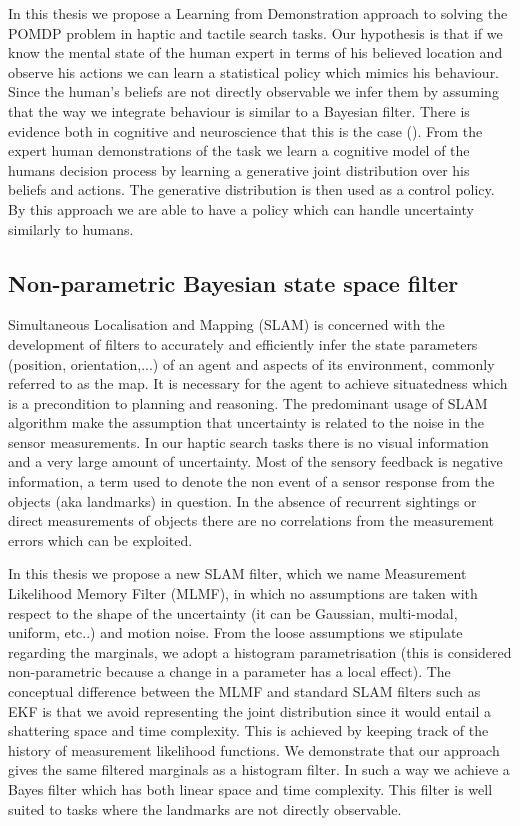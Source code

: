 In this thesis we propose a Learning from Demonstration approach to solving the POMDP problem in
haptic and tactile search tasks. Our hypothesis is that if we know the mental state of the human 
expert in terms of his believed location and observe his actions we can learn a statistical policy 
which mimics his behaviour. Since the human's beliefs are not directly observable we infer them 
by assuming that the way we integrate behaviour is similar to a Bayesian filter. There is   
evidence both in cognitive and neuroscience that this is the case (\cite{Bake_Saxe_Tene_2011}). From 
the expert human demonstrations of the task we learn a cognitive model of the humans decision process 
by learning a generative joint distribution over his beliefs and actions. The generative distribution 
is then used as a control policy. By this approach we are able to have a policy which can handle uncertainty
similarly to humans. 

\subsection{Non-parametric Bayesian state space filter}

Simultaneous Localisation and Mapping (SLAM) is concerned with the development of filters to accurately and efficiently infer 
the state parameters (position, orientation,...) of an agent and aspects of its environment, commonly referred to as the map. 
It is necessary for the agent to achieve situatedness which is a precondition to planning and reasoning. The 
predominant usage of SLAM algorithm make the assumption that uncertainty is related to the noise in the sensor measurements. In 
our haptic search tasks there is no visual information and a very large amount of uncertainty. Most of the sensory
feedback is negative information, a term used to denote the non event of a sensor response from the objects (aka landmarks) in question.
In the absence of recurrent sightings or direct measurements of objects there are no correlations from the measurement errors 
which can be exploited. 

In this thesis we propose a new SLAM filter, which we name Measurement Likelihood Memory Filter (MLMF), in 
which no assumptions are taken with respect to the shape of the uncertainty (it can be Gaussian, multi-modal, uniform, etc..) and 
motion noise. From the loose assumptions we stipulate regarding the marginals, we adopt a histogram parametrisation (this is considered non-parametric 
because a change in a parameter has a local effect). The conceptual difference between the MLMF and standard SLAM filters 
such as EKF is that we avoid representing the joint distribution since it would entail a shattering space and time complexity. 
This is achieved by keeping track of the history of measurement likelihood functions. We demonstrate that our approach gives 
the same filtered marginals as a histogram filter. In such a way we achieve a Bayes filter which has both linear space and 
time complexity. This filter is well suited to tasks where the landmarks are not directly observable.

